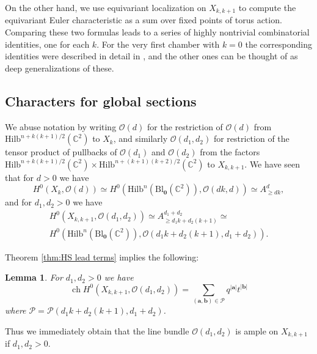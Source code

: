 \documentclass[12pt]{amsart}
\newcommand{\Hilb}{\mathrm{Hilb}}
\newcommand{\C}{\mathbb{C}}
\newcommand{\CP}{\mathcal{P}}
\newcommand{\CO}{\mathcal{O}}
\DeclareMathOperator{\ch}{ch}
\newcommand{\aaa}{\mathbf{a}}
\newcommand{\bbb}{\mathbf{b}}
\newcommand{\Bl}{\mathrm{Bl}}
\numberwithin{equation}{section}
\newtheorem{lemma}[theorem]{Lemma}
\theoremstyle{definition}
\newtheorem{remark}[theorem]{Remark}
\begin{document}
On the other hand, we use equivariant localization on $X_{k,k+1}$ to compute the equivariant Euler characteristic as a sum over fixed points of torus action. Comparing these two formulas leads to a series of highly nontrivial combinatorial identities, one for each $k$. For the very first chamber with $k=0$ the corresponding identities were described in detail in \cite[Section 4.2]{CGOT}, and the other ones can be thought of as deep generalizations of these.

\subsection{Characters for global sections}

We abuse notation by writing $\CO(d)$ for the restriction of $\CO(d)$ from $\Hilb^{n+k(k+1)/2}(\C^2)$ to $X_k$, and similarly $\CO(d_1,d_2)$ for restriction of the tensor product of pullbacks of $\CO(d_1)$ and $\CO(d_2)$ from the factors $\Hilb^{n+k(k+1)/2}(\C^2)\times \Hilb^{n+(k+1)(k+2)/2}(\C^2)$ to $X_{k,k+1}$. We have seen that for $d>0$ we have
\[ H^0(X_k,\CO(d)) \simeq H^0(\Hilb^n(\Bl_{\mathbf{0}}(\C^2)),\CO(dk,d))\simeq A^d_{\geq dk}, \]
and for $d_1,d_2>0$ we have
\begin{multline}
\label{eq:comb-H0}
  H^0(X_{k,k+1},\CO(d_1,d_2)) \simeq A^{d_1+d_2}_{\geq d_1k+d_2 (k+1)} \simeq\\ H^0(\Hilb^n(\Bl_{\mathbf{0}}(\C^2)),\CO(d_1k+d_2 (k+1),d_1+d_2)).
\end{multline}

Theorem \ref{thm:HS lead terms} implies the following:

\begin{lemma}
\label{lem:  char sections}
For $d_1,d_2>0$ we have
$$
\ch H^0(X_{k,k+1},\CO(d_1,d_2))=\sum_{(\aaa,\bbb)\in \CP}q^{|\aaa|}t^{|\bbb|}
$$
where $\CP=\CP(d_1k+d_2(k+1),d_1+d_2)$.
\end{lemma}

Thus we immediately obtain that the line bundle \(\CO(d_1,d_2)\) is ample on $X_{k,k+1}$ if \(d_1,d_2>0\).

\end{document}
